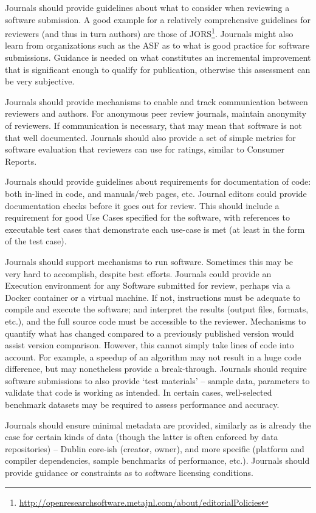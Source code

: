 \documentclass[11pt, oneside]{amsart}
\begin{document}
Journals should provide guidelines about what to consider when reviewing a
software submission. A good example for a relatively comprehensive guidelines
for reviewers (and thus in turn authors) are those of
JORS\footnote{\url{http://openresearchsoftware.metajnl.com/about/editorialPolicies}}.
Journals might also learn from organizations such as the ASF as to
what is good practice for software submissions. Guidance is needed on what
constitutes an incremental improvement that is significant enough to qualify for
publication, otherwise this assessment can be very subjective.

Journals should provide mechanisms to enable and track communication between
reviewers and authors. For anonymous peer review journals, maintain anonymity of
reviewers. If communication is necessary, that may mean that software is not
that well documented. Journals should also provide a set of simple metrics for
software evaluation that reviewers can use for ratings, similar to Consumer
Reports.

Journals should provide guidelines about requirements for documentation of code:
both in-lined in code, and manuals/web pages, etc. Journal editors could provide
documentation checks before it goes out for review. This should include a
requirement for good Use Cases specified for the software, with references to
executable test cases that demonstrate each use-case is met (at least in the
form of the test case).

Journals should support mechanisms to run software. Sometimes this may be very
hard to accomplish, despite best efforts. Journals could provide an Execution
environment for any Software submitted for review, perhaps via a Docker
container or a virtual machine. If not, instructions must be adequate to compile
and execute the software; and interpret the results (output files, formats,
etc.), and the full source code must be accessible to the reviewer. Mechanisms
to quantify what has changed compared to a previously published version would
assist version comparison. However, this cannot simply take lines of code into
account. For example, a speedup of an algorithm may not result in a huge code
difference, but may nonetheless provide a break-through. Journals should require
software submissions to also provide `test materials' -- sample data, parameters
to validate that code is working as intended. In certain cases, well-selected
benchmark datasets may be required to assess performance and accuracy.

Journals should ensure minimal metadata are provided, similarly as is already
the case for certain kinds of data (though the latter is often enforced by data
repositories) -- Dublin core-ish (creator, owner), and more specific (platform
and compiler dependencies, sample benchmarks of performance, etc.). Journals
should provide guidance or constraints as to software licensing conditions.
\end{document}
